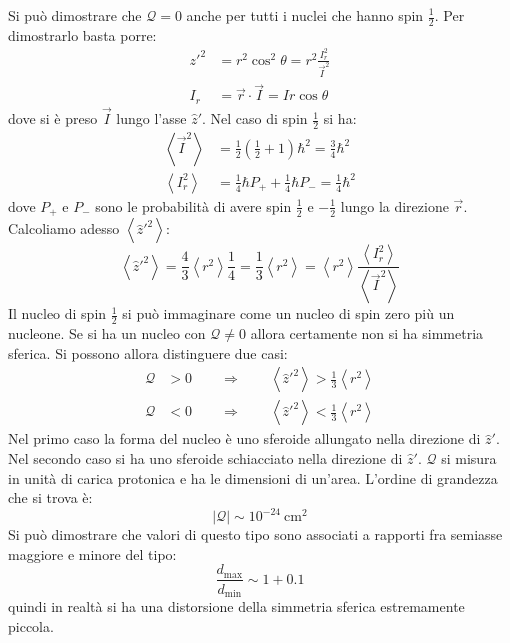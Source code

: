 Si  può dimostrare che $\mathcal{Q} = 0$ anche per tutti
i nuclei che hanno spin $\frac{1}{2}$. Per dimostrarlo basta porre:
\begin{equation}
\begin{split}
z'^2 &= r^2 \cos^2 \theta = r^2 \frac{I_r^2}{\vec{I}^2}\\
I_r &= \vec{r} \cdot \vec{I} = I r \cos \theta
\end{split}
\end{equation}
dove si è preso $\vec{I}$ lungo l'asse $\hat{z}'$. Nel caso di spin 
$\frac{1}{2}$ si ha:
\begin{equation}
\begin{split}
\left\langle \vec{I}^2 \right\rangle &= \frac{1}{2} \left( \frac{1}{2} + 1 
\right) \hbar^2 = \frac{3}{4} \hbar^2\\
\left\langle I_r^2 \right\rangle &= \frac{1}{4} \hbar P_+ + \frac{1}{4} \hbar 
P_- = \frac{1}{4} \hbar ^2
\end{split}
\end{equation}
dove $P_+$ e $P_-$ sono le probabilità di avere spin $\frac{1}{2}$ e
$-\frac{1}{2}$ lungo la direzione $\vec{r}$. Calcoliamo adesso $\left\langle
\hat{z}'^2 \right\rangle$:
\begin{equation}
\left\langle \hat{z}'^2 \right\rangle  = \frac{4}{3} \left\langle r^2 
\right\rangle \frac{1}{4} = \frac{1}{3} \left\langle r^2 \right\rangle = 
\left\langle r^2 \right\rangle \frac{\left\langle I_r^2 
\right\rangle}{\left\langle \vec{I}^2 \right\rangle}
\end{equation}
Il nucleo di spin $\frac{1}{2}$ si può immaginare come un nucleo di spin zero
più un nucleone. Se si ha un nucleo con $\mathcal{Q} \ne 0$ allora certamente
non si ha simmetria sferica. Si possono allora distinguere due casi:
\begin{equation}
\begin{split}
\mathcal{Q} &> 0 \qquad \Rightarrow \qquad \left\langle \hat{z}'^2 
\right\rangle > \frac{1}{3} \left\langle r^2 \right\rangle\\
\mathcal{Q} &< 0 \qquad \Rightarrow \qquad \left\langle \hat{z}'^2 
\right\rangle < \frac{1}{3} \left\langle r^2 \right\rangle
\end{split}
\end{equation}
Nel primo caso la forma del nucleo è uno sferoide allungato nella direzione di
$\hat{z}'$. Nel secondo caso si ha uno sferoide schiacciato nella direzione di
$\hat{z}'$. $\mathcal{Q}$ si misura in unità di carica protonica e ha le
dimensioni di un'area. L'ordine di grandezza che si trova è:
\begin{equation}
\left| \mathcal{Q} \right| \sim 10^{-24}\ \text{cm}^2
\end{equation}
Si può dimostrare che valori di questo tipo sono associati a rapporti fra
semiasse maggiore e minore del tipo:
\begin{equation}
\frac{d_\text{max}}{d_\text{min}} \sim 1 + 0.1 
\end{equation}
quindi in realtà si ha una distorsione della simmetria sferica estremamente 
piccola.

